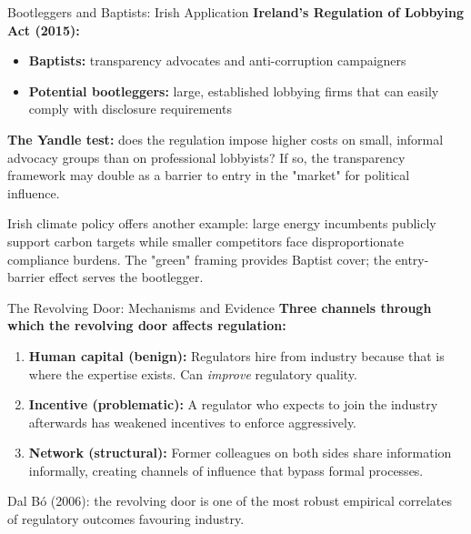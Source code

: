\documentclass[10pt]{beamer}
\begin{document}
\begin{frame}{Bootleggers and Baptists: Irish Application}
\textbf{Ireland's Regulation of Lobbying Act (2015):}

\vspace{0.1cm}
\begin{itemize}
\item \textbf{Baptists:} transparency advocates and anti-corruption campaigners
\item \textbf{Potential bootleggers:} large, established lobbying firms that can easily comply with disclosure requirements
\end{itemize}

\vspace{0.1cm}
\textbf{The Yandle test:} does the regulation impose higher costs on small, informal advocacy groups than on professional lobbyists?
If so, the transparency framework may double as a barrier to entry in the "market" for political influence.

\vspace{0.1cm}
\alert{Irish climate policy} offers another example: large energy incumbents publicly support carbon targets while smaller competitors face disproportionate compliance burdens.
The "green" framing provides Baptist cover; the entry-barrier effect serves the bootlegger.
\end{frame}


\begin{frame}{The Revolving Door: Mechanisms and Evidence}
\textbf{Three channels through which the revolving door affects regulation:}

\vspace{0.1cm}
\begin{enumerate}
\item \textbf{Human capital (benign):}
Regulators hire from industry because that is where the expertise exists.
Can \emph{improve} regulatory quality.

\vspace{0.15cm}
\item \textbf{Incentive (problematic):}
A regulator who expects to join the industry afterwards has weakened incentives to enforce aggressively.

\vspace{0.15cm}
\item \textbf{Network (structural):}
Former colleagues on both sides share information informally, creating channels of influence that bypass formal processes.
\end{enumerate}

\vspace{0.1cm}
\alert{Dal B\'{o} (2006):} the revolving door is one of the most robust empirical correlates of regulatory outcomes favouring industry.
\end{frame}
\end{document}
